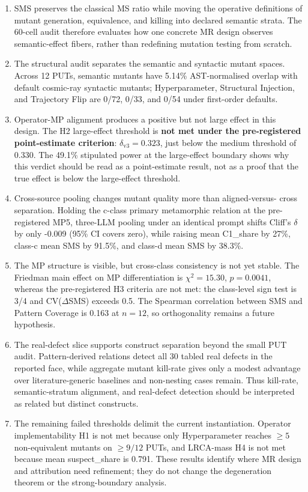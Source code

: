 \documentclass[12pt]{article}
\begin{document}
\begin{enumerate}
\item
  SMS preserves the classical MS ratio while moving the operative
  definitions of mutant generation, equivalence, and killing into
  declared semantic strata. The 60-cell audit therefore evaluates how
  one concrete MR design observes semantic-effect fibers, rather than
  redefining mutation testing from scratch.
\item
  The structural audit separates the semantic and syntactic mutant
  spaces. Across 12 PUTs, semantic mutants have 5.14\% AST-normalised
  overlap with default cosmic-ray syntactic mutants; Hyperparameter,
  Structural Injection, and Trajectory Flip are 0/72, 0/33, and 0/54
  under first-order defaults.
\item
  Operator-MP alignment produces a positive but not large effect in this
  design. The H2 large-effect threshold is \textbf{not met under the
  pre-registered point-estimate criterion}: \(\delta_{\mathrm{v3}} =
  0.323\), just below the \citet{romano2006cliff} medium threshold of
  0.330. The 49.1\% stipulated power at the large-effect boundary shows
  why this verdict should be read as a point-estimate result, not as a
  proof that the true effect is below the large-effect threshold.
\item
  Cross-source pooling changes mutant quality more than aligned-versus-
  cross separation. Holding the c-class primary metamorphic relation at
  the pre-registered MP5, three-LLM pooling under an identical prompt
  shifts Cliff's \(\delta\) by only -0.009 (95\% CI covers zero), while
  raising mean C1\_share by 27\%, class-c mean SMS by 91.5\%, and
  class-d mean SMS by 38.3\%.
\item
  The MP structure is visible, but cross-class consistency is not yet
  stable. The Friedman main effect on MP differentiation is
  \(\chi^2 = 15.30\), \(p = 0.0041\), whereas the pre-registered H3
  criteria are not met: the class-level sign test is 3/4 and
  CV(\(\Delta\)SMS) exceeds 0.5. The Spearman correlation between SMS
  and Pattern Coverage is 0.163 at \(n = 12\), so orthogonality remains
  a future hypothesis.
\item
  The real-defect slice supports construct separation beyond the small
  PUT audit. Pattern-derived relations detect all 30 tabled real defects
  in the reported face, while aggregate mutant kill-rate gives only a
  modest advantage over literature-generic baselines and non-nesting
  cases remain. Thus kill-rate, semantic-stratum alignment, and
  real-defect detection should be interpreted as related but distinct
  constructs.
\item
  The remaining failed thresholds delimit the current instantiation.
  Operator implementability H1 is not met because only Hyperparameter
  reaches \(\geq 5\) non-equivalent mutants on \(\geq 9/12\) PUTs, and
  LRCA-mass H4 is not met because mean suspect\_share is 0.791. These
  results identify where MR design and attribution need refinement; they
  do not change the degeneration theorem or the strong-boundary
  analysis.
\end{enumerate}
\end{document}
